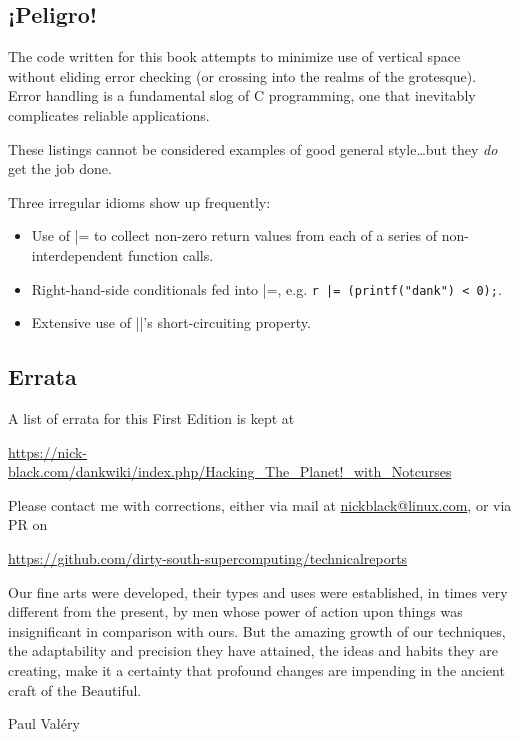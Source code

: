 \documentclass[letterpaper,10pt]{article}
\newenvironment{denseitemize}{
  \begin{itemize}
      \setlength{\itemsep}{0pt}
}{
  \end{itemize}
}
\begin{document}
\subsection*{¡Peligro!}

The code written for this book attempts to minimize use of vertical space
without eliding error checking (or crossing into the realms of the grotesque).
Error handling is a fundamental slog of C programming, one that
inevitably complicates reliable applications.

These listings cannot be considered examples of good general style\ldots but they \textit{do} get the job done.

Three irregular idioms show up frequently:

\begin{denseitemize}
\item{Use of |= to collect non-zero return values from each of a series of
      non-interdependent function calls.}
\item{Right-hand-side conditionals fed into |=, e.g. \texttt{r |= (printf("dank") < 0);}.}
\item{Extensive use of ||'s short-circuiting property.}
\end{denseitemize}

\subsection*{Errata}
A list of errata for this First Edition is kept at
\begin{center}
\url{https://nick-black.com/dankwiki/index.php/Hacking\_The\_Planet!\_with\_Notcurses}
\end{center}
Please contact me with corrections, either via mail at \href{mailto:nickblack@linux.com}{nickblack@linux.com},
or via PR on
\begin{center}
\url{https://github.com/dirty-south-supercomputing/technicalreports}
\end{center}

\clearpage

\epigraph{Our fine arts were developed, their types and uses were established, in times
very different from the present, by men whose power of action upon things was
insignificant in comparison with ours. But the amazing growth of our
techniques, the adaptability and precision they have attained, the ideas and
habits they are creating, make it a certainty that profound changes are
impending in the ancient craft of the Beautiful.}{Paul Valéry}
\end{document}
